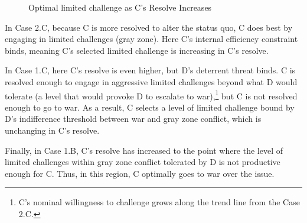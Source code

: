 \documentclass[bibtex, autowc]{apsr_submission}
\begin{document}
\begin{figure}[h]
    \caption{Optimal limited challenge as C's Resolve Increases}
    \label{fig:optimalresolveincrease}
    \end{figure}

In Case 2.C, because C is more resolved to alter the status quo, C does best by engaging in limited challenges (gray zone). Here C's internal efficiency constraint binds, meaning C's selected limited challenge is increasing in C's resolve.

In Case 1.C, here C's resolve is even higher, but D's deterrent threat binds. C is resolved enough to engage in aggressive limited challenges beyond what D would tolerate (a level that would provoke D to escalate to war),\footnote{C's nominal willingness to challenge grows along the trend line from the Case 2.C.} but C is not resolved enough to go to war. As a result, C selects a level of limited challenge bound by D's indifference threshold between war and gray zone conflict, which is unchanging in C's resolve.

Finally, in Case 1.B, C's resolve has increased to the point where the level of limited challenges within gray zone conflict tolerated by D is not productive enough for C. Thus, in this region, C optimally goes to war over the issue.
\end{document}
